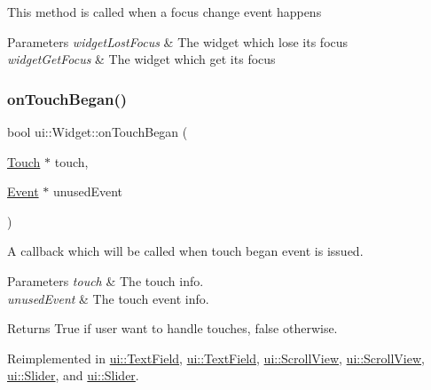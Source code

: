 This method is called when a focus change event happens 
\begin{DoxyParams}{Parameters}
{\em widget\+Lost\+Focus} & The widget which lose its focus \\
\hline
{\em widget\+Get\+Focus} & The widget which get its focus \\
\hline
\end{DoxyParams}
\mbox{\label{classui_1_1Widget_a7885c770dde6daef771515c9857674a8}} 
\subsubsection{\texorpdfstring{on\+Touch\+Began()}{onTouchBegan()}\hspace{0.1cm}{\footnotesize\ttfamily [1/2]}}
{\footnotesize\ttfamily bool ui\+::\+Widget\+::on\+Touch\+Began (\begin{DoxyParamCaption}\item[{\hyperlink{classTouch}{Touch} $\ast$}]{touch,  }\item[{\hyperlink{classEvent}{Event} $\ast$}]{unused\+Event }\end{DoxyParamCaption})\hspace{0.3cm}{\ttfamily [virtual]}}

A callback which will be called when touch began event is issued. 
\begin{DoxyParams}{Parameters}
{\em touch} & The touch info. \\
\hline
{\em unused\+Event} & The touch event info. \\
\hline
\end{DoxyParams}
\begin{DoxyReturn}{Returns}
True if user want to handle touches, false otherwise. 
\end{DoxyReturn}


Reimplemented in \hyperlink{classui_1_1TextField_ad747be5e9c98b2aa44d839dfd282fc2e}{ui\+::\+Text\+Field}, \hyperlink{classui_1_1TextField_a4716933981fd6f75e03baed7ec565587}{ui\+::\+Text\+Field}, \hyperlink{classui_1_1ScrollView_a04c7e9105bf26f9d79cd907c6b23f41d}{ui\+::\+Scroll\+View}, \hyperlink{classui_1_1ScrollView_a8cef5058b831f9b3644d894408371245}{ui\+::\+Scroll\+View}, \hyperlink{classui_1_1Slider_a87345df854374dff2d59a401349e8de8}{ui\+::\+Slider}, and \hyperlink{classui_1_1Slider_af3407f0844a379de234e2d321f3fb562}{ui\+::\+Slider}.

